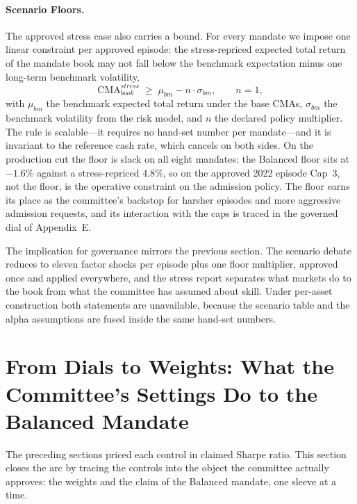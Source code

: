 \documentclass[pdftex,12pt,a4paper]{article}
\begin{document}
\paragraph*{Scenario Floors.} The approved stress case also carries a bound. For every mandate we impose one linear constraint per approved episode: the stress-repriced expected total return of the mandate book may not fall below the benchmark expectation minus one long-term benchmark volatility,
\begin{equation}\label{eq:floor}
	\text{CMA}^{stress}_{book} \;\ge\; \mu_{bm} - n \cdot \sigma_{bm}, \qquad n = 1,
\end{equation}
with $\mu_{bm}$ the benchmark expected total return under the base CMAs, $\sigma_{bm}$ the benchmark volatility from the risk model, and $n$ the declared policy multiplier. The rule is scalable---it requires no hand-set number per mandate---and it is invariant to the reference cash rate, which cancels on both sides. On the production cut the floor is slack on all eight mandates: the Balanced floor sits at $-1.6\%$ against a stress-repriced $4.8\%$, so on the approved 2022 episode Cap~3, not the floor, is the operative constraint on the admission policy. The floor earns its place as the committee's backstop for harsher episodes and more aggressive admission requests, and its interaction with the caps is traced in the governed dial of Appendix~E.

The implication for governance mirrors the previous section. The scenario debate reduces to eleven factor shocks per episode plus one floor multiplier, approved once and applied everywhere, and the stress report separates what markets do to the book from what the committee has assumed about skill. Under per-asset construction both statements are unavailable, because the scenario table and the alpha assumptions are fused inside the same hand-set numbers.


\sectionfont{\MakeUppercase}
\section*{From Dials to Weights: What the Committee's Settings Do to the Balanced Mandate}\label{sec:dials}

The preceding sections priced each control in claimed Sharpe ratio. This section closes the arc by tracing the controls into the object the committee actually approves: the weights and the claim of the Balanced mandate, one sleeve at a time.
\end{document}
